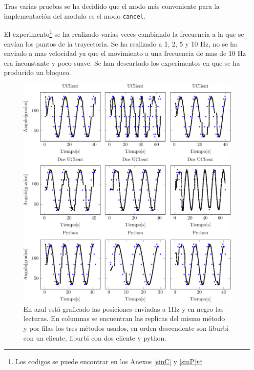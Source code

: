 \documentclass[12pt,a4paper,final,twoside]{book}
\begin{document}
Tras varias pruebas se ha decidido que el modo más conveniente para la implementación del modulo es el modo \texttt{cancel}.

El experimento\footnote{Los codigos se puede encontrar en los Anexos \ref{sinC} y \ref{sinP}} se ha realizado varias veces cambiando la frecuencia a la que se envían los puntos de la trayectoria. Se ha realizado a 1, 2, 5 y 10 Hz, no se ha enviado a mas velocidad ya que el movimiento a una frecuencia de mas de 10 Hz era inconstante y poco suave.
Se han descartado los experimentos en que se ha producido un bloqueo.
 


\begin{figure}[H]
	\centering
    \includegraphics[scale=1]{plots/h1-f1.pdf}
 
   	 \caption{En azul está graficado las posiciones enviadas a 1Hz y en negro las lecturas. En columnas se encuentran las replicas del mismo método y por filas los tres métodos usados, en orden descendente son liburbi con un cliente, liburbi con dos cliente y python.}
  \label{fig:sin1H}
\end{figure}
\end{document}
